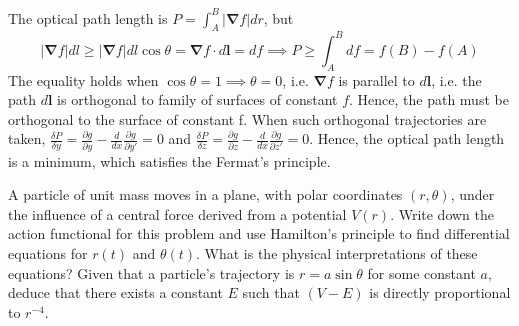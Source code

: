 \documentclass[a4paper]{article}
\begin{document}
\begin{ans}
The optical path length is $P=\int_A^B|\boldsymbol{\nabla}f|dr$, but
$$|\boldsymbol{\nabla}f|dl\geq|\boldsymbol{\nabla}f|dl\cos\theta=\boldsymbol{\nabla}f\cdot d\mathbf{l}=df\implies P\geq\int_A^Bdf=f(B)-f(A)$$
The equality holds when $\cos\theta=1\implies\theta=0$, i.e. $\boldsymbol{\nabla}f$ is parallel to $d\mathbf{l}$, i.e. the path  $d\mathbf{l}$ is orthogonal to family of surfaces of constant $f$.
Hence, the path must be orthogonal to the surface of constant f. When such orthogonal trajectories are taken, $\frac{\delta P}{\delta y}=\frac{\partial g}{\partial y}-\frac{d}{dx}\frac{\partial g}{\partial y'}=0$ and $\frac{\delta P}{\delta z}=\frac{\partial g}{\partial z}-\frac{d}{dx}\frac{\partial g}{\partial z'}=0$. Hence, the optical path length is a minimum, which satisfies the Fermat's principle.
\end{ans}
\begin{qns}[Lagrangian]
A particle of unit mass moves in a plane, with polar coordinates $(r,\theta)$, under the influence of a central force derived from a potential $V (r)$. Write down the action functional for this problem and use Hamilton's principle to find differential equations for $r(t)$ and $\theta(t)$. What is the physical interpretations of these equations? Given that a particle's trajectory is $r=a\sin\theta$ for some constant $a$, deduce that there exists a constant $E$ such that $(V-E)$ is directly proportional to $r^{-4}$.
\end{qns}
\end{document}
